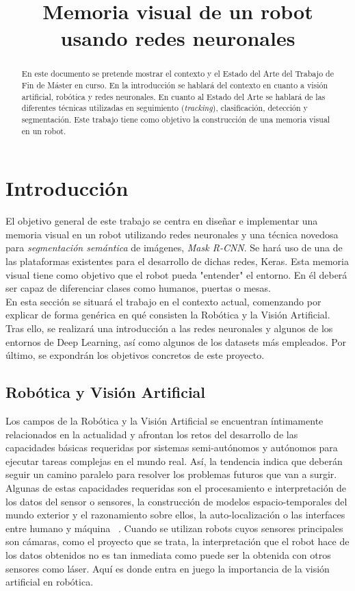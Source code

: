 \documentclass{bmvc2k}
\title{Memoria visual de un robot usando redes neuronales}
\begin{document}
\maketitle

\begin{abstract}
En este documento se pretende mostrar el contexto y el Estado del Arte del Trabajo de Fin de Máster en curso. En la introducción se hablará del contexto en cuanto a visión artificial, robótica y redes neuronales. En cuanto al Estado del Arte se hablará de las diferentes técnicas utilizadas en seguimiento (\textit{tracking}), clasificación, detección y segmentación. Este trabajo tiene como objetivo la construcción de una memoria visual en un robot.
\end{abstract}

\section{Introducción}
\label{sec:intro}
El objetivo general de este trabajo se centra en diseñar e implementar una memoria visual en un robot
utilizando redes neuronales y una técnica novedosa para \textit{segmentación semántica} de imágenes, \textit{Mask R-CNN}. Se hará uso de una de las plataformas existentes para el desarrollo de dichas redes, Keras. Esta memoria visual tiene como objetivo que el robot pueda "entender" el entorno. En él deberá ser capaz de diferenciar clases como humanos, puertas o mesas.\\
\noindent En esta sección se situará el trabajo en el contexto actual, comenzando por explicar de forma genérica en qué consisten la Robótica y la Visión Artificial. Tras ello, se realizará una introducción a las redes neuronales y algunos de los entornos de Deep Learning, así como algunos de los datasets más empleados. Por último, se expondrán los objetivos concretos de este proyecto.

\subsection{Robótica y Visión Artificial}
Los campos de la Robótica y la Visión Artificial se encuentran íntimamente relacionados en la actualidad y afrontan los retos del desarrollo de las capacidades básicas requeridas por sistemas semi-autónomos y autónomos para ejecutar tareas complejas en el mundo real. Así, la tendencia indica que deberán seguir un camino paralelo para resolver los problemas futuros que van a surgir. Algunas de estas capacidades requeridas son el procesamiento e interpretación de los datos del sensor o sensores, la construcción de modelos espacio-temporales del mundo exterior y el razonamiento sobre ellos, la auto-localización o las interfaces entre humano y máquina ~\cite{campos1998introduction}. Cuando se utilizan robots cuyos sensores principales son cámaras, como el proyecto que se trata, la interpretación que el robot hace de los datos obtenidos no es tan inmediata como puede ser la obtenida con otros sensores como láser. Aquí es donde entra en juego la importancia de la visión artificial en robótica.
\end{document}
